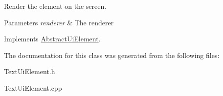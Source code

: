 Render the element on the screen. 


\begin{DoxyParams}{Parameters}
{\em renderer} & The renderer\\
\hline
\end{DoxyParams}


Implements \mbox{\hyperlink{class_abstract_ui_element_aea66ce333323cf2d5e12d4de9515de7b}{Abstract\+Ui\+Element}}.



The documentation for this class was generated from the following files\+:\begin{DoxyCompactItemize}
\item 
Text\+Ui\+Element.\+h\item 
Text\+Ui\+Element.\+cpp\end{DoxyCompactItemize}
